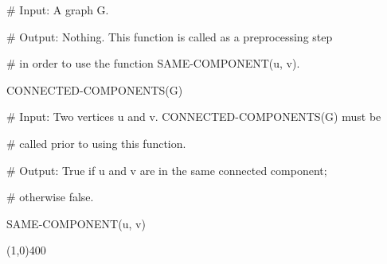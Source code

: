 \begin{allintypewriter}
\# Input: A graph G.

\hspace{0cm}

\# Output: Nothing. This function is called as a preprocessing step 

\# in order to use the function SAME-COMPONENT(u, v).

\hspace{0.5cm}


CONNECTED-COMPONENTS(G) 

\hspace{0cm}

\# Input: Two vertices u and v. CONNECTED-COMPONENTS(G) must be 

\#  called prior to using this function.

\hspace{0cm}

\# Output: True if u and v are in the same connected component;

\# otherwise false. 

\hspace{0cm}

SAME-COMPONENT(u, v) 
\end{allintypewriter}

\begin{center}
\line(1,0){400}
\end{center}


